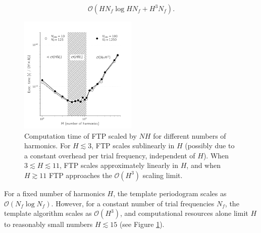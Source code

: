 \documentclass{aastex62}
\newcommand{\bigO}{\mathcal{O}}
\begin{document}
\begin{equation}
\bigO(HN_f \log HN_f + H^3N_f).
\end{equation}

\begin{figure}
    \centering
    \includegraphics[width=0.5\textwidth]{timing_vs_nharm.pdf}
    \caption{\label{fig:timingnharm} Computation time of FTP scaled by $NH$ for
            different numbers of harmonics. For $H\lesssim 3$, FTP scales
            sublinearly in $H$ (possibly due to a constant overhead per
            trial frequency, independent of $H$). When $3 \lesssim H \lesssim 11$,
            FTP scales approximately linearly in $H$, and when $H \gtrsim 11$
            FTP approaches the $\bigO(H^3)$ scaling limit.}
\end{figure}

For a fixed number of harmonics $H$, the template periodogram scales as
$\bigO(N_f\log N_f)$. However, for a constant number of trial frequencies $N_f$,
the template algorithm scales as $\bigO(H^3)$, and computational resources
alone limit $H$ to reasonably small numbers $H\lesssim15$ (see Figure \ref{fig:timingnharm}).



\end{document}
